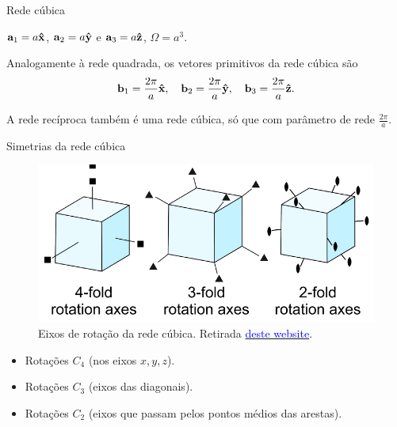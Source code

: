 \documentclass[aspectratio=169]{beamer}
\begin{document}


\begin{frame}{Rede cúbica}

$\vb{a}_1 = a \vu{x}$, $\vb{a}_2 = a\vu{y}$ e $\vb{a}_3 = a\vu{z}$, $\Omega = a^3$.

\n\n

Analogamente à rede quadrada, os vetores primitivos da rede cúbica são
$$
\vb{b}_1 = \frac{2\pi}{a} \vu{x}, \quad \vb{b}_2 = \frac{2\pi}{a} \vu{y}, \quad \vb{b}_3 = \frac{2\pi}{a} \vu{z}.
$$

\n\n

A rede recíproca também é uma rede cúbica, só que com parâmetro de rede $\displaystyle{\frac{2\pi}{a}}$.

\end{frame}




\begin{frame}{Simetrias da rede cúbica}

\begin{figure}[H]
\centering
\includegraphics[width=0.6\linewidth]{fig/rot_cubic.png}
\caption{Eixos de rotação da rede cúbica. Retirada \href{https://opengeology.org/Mineralogy/10-crystal-morphology-and-symmetry/}{\textcolor{blue}{deste website}}.}
\label{fig:rot_cubic}
\end{figure}


\begin{itemize}
\item Rotações $C_4$ (nos eixos $x, y, z$).
\item Rotações $C_3$ (eixos das diagonais).
\item Rotações $C_2$ (eixos que passam pelos pontos médios das arestas).
\end{itemize}

\end{frame}


\end{document}
